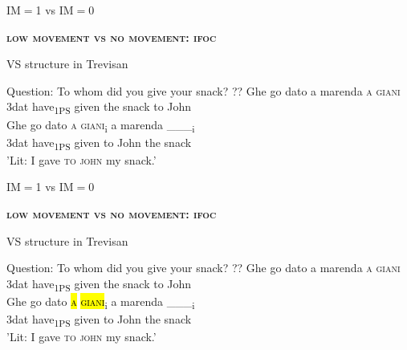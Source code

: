 \documentclass[lesson_slides]{subfiles}
\begin{document}
\begin{frame}[c]{IM$=$1 vs IM$=$0}

    \noindent \textbf{\textsc{low movement vs no movement: ifoc}}

    \begin{exe}
        \ex VS structure in Trevisan
            \begin{xlist}
                \ex Question: To whom did you give your snack?
                \ex \gll ?? Ghe go dato a marenda \textsc{a} \textsc{giani}\\
                {} 3dat have\textsubscript{1PS} given the snack to John\\
                \ex \gll Ghe go dato \textsc{a} \textsc{giani}\textsubscript{i} a marenda \_\_\_\textsubscript{i} \\
                3dat have\textsubscript{1PS} given to John the snack\\
                \glt 'Lit: I gave \textsc{to} \textsc{john} my snack.'
            \end{xlist}
    \end{exe}

\end{frame}
\begin{frame}[c]{IM$=$1 vs IM$=$0}

    \noindent \textbf{\textsc{low movement vs no movement: ifoc}}

    \begin{exe}
        \ex VS structure in Trevisan
            \begin{xlist}
                \ex Question: To whom did you give your snack?
                \ex \gll ?? Ghe go dato a marenda \textsc{a} \textsc{giani}\\
                {} 3dat have\textsubscript{1PS} given the snack to John\\
                \ex \gll Ghe go dato \hl{\textsc{a}} \hl{\textsc{giani}}\textsubscript{i} a marenda \_\_\_\textsubscript{i} \\
                3dat have\textsubscript{1PS} given to John the snack\\
                \glt 'Lit: I gave \textsc{to} \textsc{john} my snack.'
            \end{xlist}
    \end{exe}

\end{frame}
\end{document}
